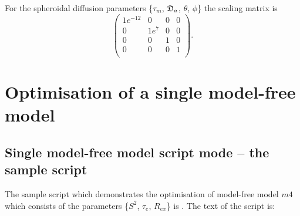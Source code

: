 \begin{htmlonly}
\begin{htmlonly}
\noindent  For the spheroidal diffusion parameters \{$\tau_m$, $\mathfrak{D}_a$, $\theta$, $\phi$\} the scaling matrix is
\begin{equation}
    \begin{pmatrix}
        1e^{-12} &  0 &  0 &  0 \\
        0 &  1e^7 &  0 &  0 \\
        0 &  0 &  1 &  0 \\
        0 &  0 &  0 &  1 \\
    \end{pmatrix}.
\end{equation}





\section{Optimisation of a single model-free model}\label{sect: single mf model}



\subsection{Single model-free model script mode -- the sample script}

The sample script which demonstrates the optimisation of model-free model $m4$ which consists of the parameters \{$S^2$, $\tau_e$, $R_{ex}$\} is .  The text of the script is:


\end{htmlonly}
\end{htmlonly}

